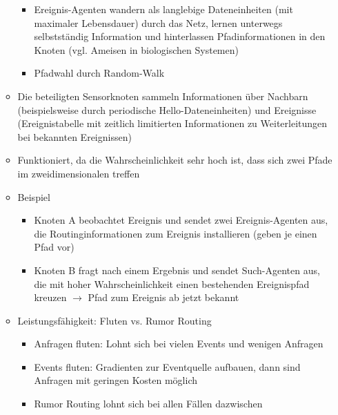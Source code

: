 \begin{itemize}
\begin{itemize}
\begin{itemize}
			\item Ereignis-Agenten wandern als langlebige Dateneinheiten (mit maximaler Lebensdauer) durch das Netz, lernen unterwegs selbstständig Information und hinterlassen Pfadinformationen in den Knoten (vgl. Ameisen in biologischen Systemen)
			\item Pfadwahl durch Random-Walk
		\end{itemize}
		\item Die beteiligten Sensorknoten sammeln Informationen über Nachbarn (beispielsweise durch periodische Hello-Dateneinheiten) und Ereignisse (Ereignistabelle mit zeitlich limitierten Informationen zu Weiterleitungen bei bekannten Ereignissen)
		\item Funktioniert, da die Wahrscheinlichkeit sehr hoch ist, dass sich zwei Pfade im zweidimensionalen treffen
		\item Beispiel
		\begin{itemize}
			\item Knoten A beobachtet Ereignis und sendet zwei Ereignis-Agenten aus, die Routinginformationen zum Ereignis installieren (geben je einen Pfad vor)
			\item Knoten B fragt nach einem Ergebnis und sendet Such-Agenten aus, die mit hoher Wahrscheinlichkeit einen bestehenden Ereignispfad kreuzen \(\rightarrow\) Pfad zum Ereignis ab jetzt bekannt
		\end{itemize}
		\item Leistungsfähigkeit: Fluten vs. Rumor Routing
		\begin{itemize}
			\item Anfragen fluten: Lohnt sich bei vielen Events und wenigen Anfragen
			\item Events fluten: Gradienten zur Eventquelle aufbauen, dann sind Anfragen mit geringen Kosten möglich
			\item Rumor Routing lohnt sich bei allen Fällen dazwischen 
		\end{itemize}
	\end{itemize}
\end{itemize}

